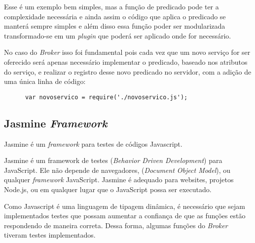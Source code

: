 Esse é um exemplo bem simples, mas a função de predicado pode ter a complexidade necessária e ainda assim o código que aplica o predicado se manterá sempre simples e além disso essa função poder ser modularizada transformado-se em um \textit{plugin} que poderá ser aplicado onde for necessário.

No caso do \textit{Broker} isso foi fundamental pois cada vez que um novo serviço for ser oferecido será apenas necessário implementar o predicado, baseado nos atributos do serviço, e realizar o registro desse novo predicado no servidor, com a adição de uma única linha de código:

\begin{footnotesize}
  \begin{verbatim}
      var novoservico = require('./novoservico.js');
  \end{verbatim}
\end{footnotesize}

\subsection{Jasmine \normalfont\itshape Framework}
Jasmine é um \textit{framework} para testes de códigos Javascript.
\begin{citacao}
Jasmine é um framework de testes  (\textit{Behavior Driven Development}) para JavaScript. Ele não depende de navegadores,  (\textit{Document Object Model}), ou qualquer \textit{framework} JavaScript. Jasmine é adequado para websites, projetos Node.js, ou em qualquer lugar que o JavaScript possa ser executado.\cite{jasmine}
\end{citacao}

Como Javascript é uma linguagem de tipagem dinâmica, é necessário que sejam implementados testes que possam aumentar a confiança de que as funções estão respondendo de maneira correta.
Dessa forma, algumas funções do \textit{Broker} tiveram testes implementados.

